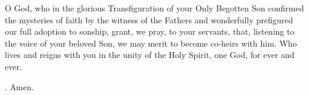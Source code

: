 \lettrine[lines=3]{O}{} God, who in the glorious Transfiguration
of your Only Begotten Son
confirmed the mysteries of faith by the witness of the Fathers
and wonderfully prefigured our full adoption to sonship,
grant, we pray, to your servants,
that, listening to the voice of your beloved Son,
we may merit to become co-heirs with him.
Who lives and reigns with you in the unity of the Holy Spirit,
one God, for ever and ever. \par \Rbar. Amen.
